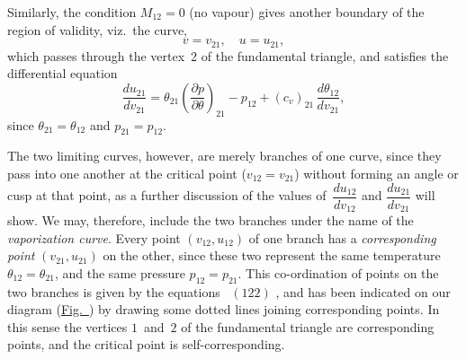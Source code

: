 \documentclass[12pt]{book}[2005/09/16]
\newcommand{\Eq}[1]{%
  \hyperref[eqn:#1]{\ensuremath{#1}}%
}
\newcommand{\Fig}[1]{\hyperref[fig:#1]{Fig.~{\upshape #1}}}
\newcommand{\PageSep}[1]{\ignorespaces}
\newcommand{\dd}{\partial}
\begin{document}
Similarly, the condition $M_{12} = 0$ (no vapour) gives another
boundary of the region of validity, viz.\ the curve,
\[
v = v_{21},\quad
u = u_{21},
\]
which passes through the vertex~$2$ of the fundamental
triangle, and satisfies the differential equation
\[
\frac{du_{21}}{dv_{21}}
  = \theta_{21} \left(\frac{\dd p}{\dd \theta}\right)_{21} - p_{12} + (c_{v})_{21}\, \frac{d\theta_{12}}{dv_{21}},
\]
since $\theta_{21} = \theta_{12}$ and $p_{21} = p_{12}$.

The two limiting curves, however, are merely branches
of one curve, since they pass into one another at the critical
point ($v_{12} = v_{21}$) without forming an angle or cusp at that
\PageSep{161}
%
%
%
%
%
%
point, as a further discussion of the values of~$\dfrac{du_{12}}{dv_{12}}$ and
$\dfrac{du_{21}}{dv_{21}}$ will show. We may, therefore, include the two branches
under the name of the \emph{vaporization curve}. Every point
%
$(v_{12}, u_{12})$ of one branch has a \emph{corresponding point} $(v_{21}, u_{21})$ on
the other, since these two represent the same temperature
$\theta_{12} = \theta_{21}$, and the same pressure $p_{12} = p_{21}$. This co-ordination
of points on the two branches is given by the equations~\Eq{(122)},
and has been indicated on our diagram (\Fig{4}) by
drawing some dotted lines joining corresponding points.
In this sense the vertices $1$~and~$2$ of the fundamental
triangle are corresponding points, and the critical point is
self-corresponding.
\end{document}
